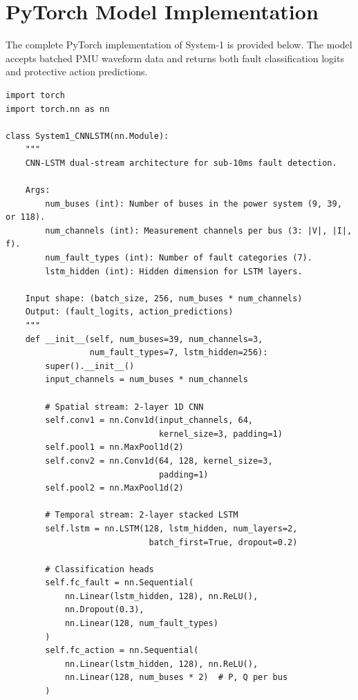 \documentclass[journal]{IEEEtran}
\begin{document}
\appendices

\section{PyTorch Model Implementation}
\label{app:pytorch}

The complete PyTorch implementation of System-1 is provided below. The model accepts batched PMU waveform data and returns both fault classification logits and protective action predictions.

{\footnotesize
\begin{verbatim}
import torch
import torch.nn as nn

class System1_CNNLSTM(nn.Module):
    """
    CNN-LSTM dual-stream architecture for sub-10ms fault detection.
    
    Args:
        num_buses (int): Number of buses in the power system (9, 39, or 118).
        num_channels (int): Measurement channels per bus (3: |V|, |I|, f).
        num_fault_types (int): Number of fault categories (7).
        lstm_hidden (int): Hidden dimension for LSTM layers.
    
    Input shape: (batch_size, 256, num_buses * num_channels)
    Output: (fault_logits, action_predictions)
    """
    def __init__(self, num_buses=39, num_channels=3,
                 num_fault_types=7, lstm_hidden=256):
        super().__init__()
        input_channels = num_buses * num_channels

        # Spatial stream: 2-layer 1D CNN
        self.conv1 = nn.Conv1d(input_channels, 64,
                               kernel_size=3, padding=1)
        self.pool1 = nn.MaxPool1d(2)
        self.conv2 = nn.Conv1d(64, 128, kernel_size=3,
                               padding=1)
        self.pool2 = nn.MaxPool1d(2)

        # Temporal stream: 2-layer stacked LSTM
        self.lstm = nn.LSTM(128, lstm_hidden, num_layers=2,
                             batch_first=True, dropout=0.2)

        # Classification heads
        self.fc_fault = nn.Sequential(
            nn.Linear(lstm_hidden, 128), nn.ReLU(),
            nn.Dropout(0.3),
            nn.Linear(128, num_fault_types)
        )
        self.fc_action = nn.Sequential(
            nn.Linear(lstm_hidden, 128), nn.ReLU(),
            nn.Linear(128, num_buses * 2)  # P, Q per bus
        )


\end{verbatim}}
\end{document}
